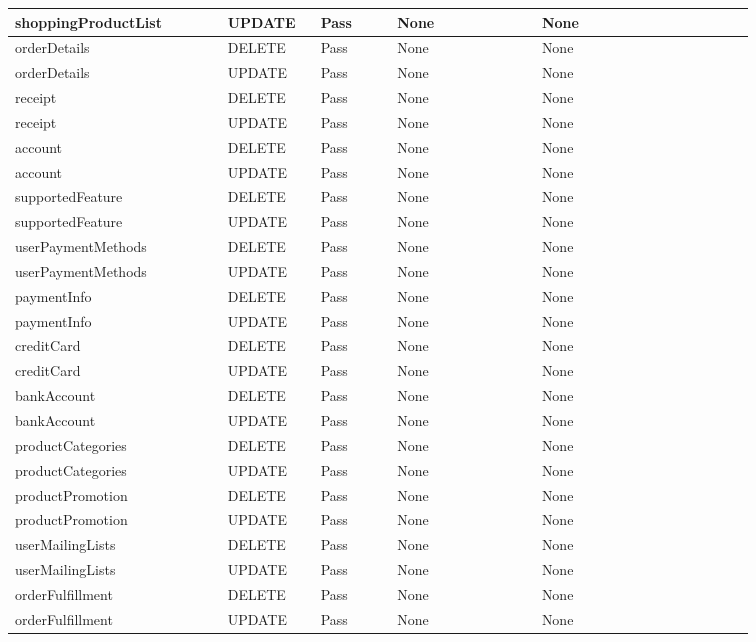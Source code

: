 \begin{spacing}{1.25}
\begin{longtable}{ | p{0.25\linewidth} | p{0.1\linewidth} | p{0.09\linewidth} | p{0.17\linewidth} | p{0.25\linewidth} | }
shoppingProductList			&	UPDATE		&	Pass		&	None							&	None				\\\hline
orderDetails				&	DELETE		&	Pass		&	None							&	None				\\\hline
orderDetails				&	UPDATE		&	Pass		&	None							&	None				\\\hline
receipt						&	DELETE		&	Pass		&	None							&	None				\\\hline
receipt						&	UPDATE		&	Pass		&	None							&	None				\\\hline
account						&	DELETE		&	Pass		&	None							&	None				\\\hline
account						&	UPDATE		&	Pass		&	None							&	None				\\\hline
supportedFeature			&	DELETE		&	Pass		&	None							&	None				\\\hline
supportedFeature			&	UPDATE		&	Pass		&	None							&	None				\\\hline
userPaymentMethods			&	DELETE		&	Pass		&	None							&	None				\\\hline
userPaymentMethods			&	UPDATE		&	Pass		&	None							&	None				\\\hline
paymentInfo					&	DELETE		&	Pass		&	None							&	None				\\\hline
paymentInfo					&	UPDATE		&	Pass		&	None							&	None				\\\hline
creditCard					&	DELETE		&	Pass		&	None							&	None				\\\hline
creditCard					&	UPDATE		&	Pass		&	None							&	None				\\\hline
bankAccount					&	DELETE		&	Pass		&	None							&	None				\\\hline
bankAccount					&	UPDATE		&	Pass		&	None							&	None				\\\hline
productCategories			&	DELETE		&	Pass		&	None							&	None				\\\hline
productCategories			&	UPDATE		&	Pass		&	None							&	None				\\\hline
productPromotion			&	DELETE		&	Pass		&	None							&	None				\\\hline
productPromotion			&	UPDATE		&	Pass		&	None							&	None				\\\hline
userMailingLists			&	DELETE		&	Pass		&	None							&	None				\\\hline
userMailingLists			&	UPDATE		&	Pass		&	None							&	None				\\\hline
orderFulfillment			&	DELETE		&	Pass		&	None							&	None				\\\hline
orderFulfillment			&	UPDATE		&	Pass		&	None							&	None				\\\hline

\end{longtable}
\end{spacing}

